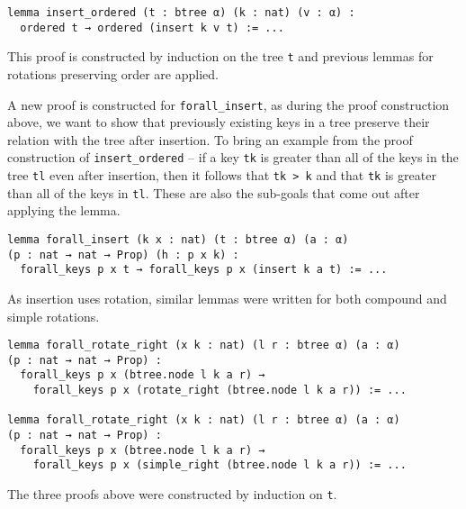 \begin{lstlisting}
lemma insert_ordered (t : btree α) (k : nat) (v : α) :
  ordered t → ordered (insert k v t) := ...
\end{lstlisting}

This proof is constructed by induction on the tree \lstinline{t} and previous lemmas for rotations preserving order are applied. 

A new proof is constructed for \lstinline{forall_insert}, as during the proof construction above, we want to show that previously existing keys in a tree preserve their relation with the tree after insertion. To bring an example from the proof construction of \lstinline{insert_ordered} -- if a key \lstinline{tk} is greater than all of the keys in the tree \lstinline{tl} even after insertion, then it follows that \lstinline{tk > k} and that \lstinline{tk} is greater than all of the keys in \lstinline{tl}. These are also the sub-goals that come out after applying the lemma.

\begin{lstlisting}
lemma forall_insert (k x : nat) (t : btree α) (a : α) 
(p : nat → nat → Prop) (h : p x k) :
  forall_keys p x t → forall_keys p x (insert k a t) := ...
\end{lstlisting}

As insertion uses rotation, similar lemmas were written for both compound and simple rotations.

\begin{lstlisting}
lemma forall_rotate_right (x k : nat) (l r : btree α) (a : α) 
(p : nat → nat → Prop) :
  forall_keys p x (btree.node l k a r) → 
    forall_keys p x (rotate_right (btree.node l k a r)) := ...

lemma forall_rotate_right (x k : nat) (l r : btree α) (a : α) 
(p : nat → nat → Prop) :
  forall_keys p x (btree.node l k a r) → 
    forall_keys p x (simple_right (btree.node l k a r)) := ...
\end{lstlisting}

The three proofs above were constructed by induction on \lstinline{t}.